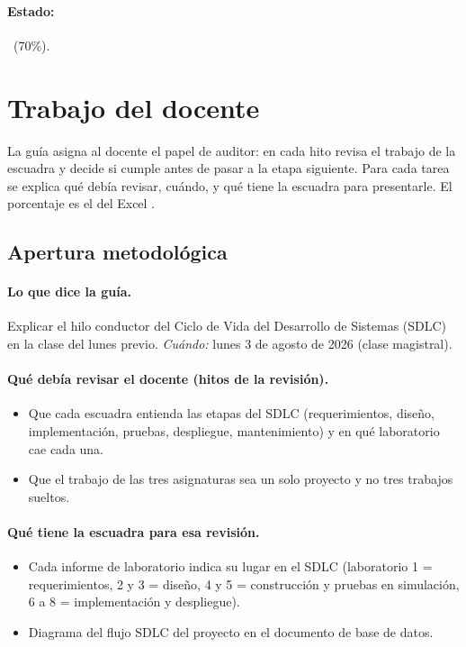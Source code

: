\documentclass[a4paper,11pt]{article}
\begin{document}
\paragraph{Estado:} \parcial~(70\%).
\section{Trabajo del docente}
La guía asigna al docente el papel de auditor: en cada hito revisa el trabajo de la escuadra y decide si cumple antes de pasar a la etapa siguiente. Para cada tarea se explica qué debía revisar, cuándo, y qué tiene la escuadra para presentarle. El porcentaje es el del Excel .
\subsection{Apertura metodológica}
\paragraph{Lo que dice la guía.} Explicar el hilo conductor del Ciclo de Vida del Desarrollo de Sistemas (SDLC) en la clase del lunes previo. \textit{Cuándo:} lunes 3 de agosto de 2026 (clase magistral).
\paragraph{Qué debía revisar el docente (hitos de la revisión).}
\begin{itemize}
\item[$\square$] Que cada escuadra entienda las etapas del SDLC (requerimientos, diseño, implementación, pruebas, despliegue, mantenimiento) y en qué laboratorio cae cada una.
\item[$\square$] Que el trabajo de las tres asignaturas sea un solo proyecto y no tres trabajos sueltos.
\end{itemize}
\paragraph{Qué tiene la escuadra para esa revisión.}
\begin{itemize}
\item Cada informe de laboratorio indica su lugar en el SDLC (laboratorio 1 = requerimientos, 2 y 3 = diseño, 4 y 5 = construcción y pruebas en simulación, 6 a 8 = implementación y despliegue).
\item Diagrama del flujo SDLC del proyecto en el documento de base de datos.
\end{itemize}
\end{document}
